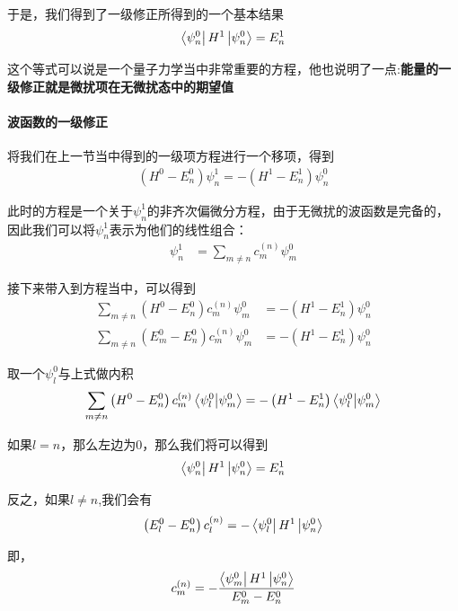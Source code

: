 \documentclass{article}
\begin{document}
于是，我们得到了一级修正所得到的一个基本结果
\begin{equation*}
    \bra{\psi_n^0}H^1\ket{\psi_n^0}=E_n^1
\end{equation*}

这个等式可以说是一个量子力学当中非常重要的方程，他也说明了一点:\textbf{能量的一级修正就是微扰项在无微扰态中的期望值}

\paragraph{波函数的一级修正}将我们在上一节当中得到的一级项方程进行一个移项，得到
\begin{align*}
    \left(H^0-E_n^0\right)\psi_n^1=-\left(H^1-E_n^1\right)\psi_n^0
\end{align*}

此时的方程是一个关于$\psi_n^1$的非齐次偏微分方程，由于无微扰的波函数是完备的，因此我们可以将$\psi_n^1$表示为他们的线性组合：
\begin{align*}
    \psi_n^1&=\sum_{m\neq n}c_m^{(n)}\psi_m^0
\end{align*}

接下来带入到方程当中，可以得到
\begin{align*}
    \sum_{m\neq n}\left(H^0-E_n^0\right)c_m^{(n)}\psi_m^0&=-\left(H^1-E_n^1\right)\psi_n^0\\
    \sum_{m\neq n}\left(E_m^0-E_n^0\right)c_m^{(n)}\psi_m^0&=-\left(H^1-E_n^1\right)\psi_n^0
\end{align*}

取一个$\psi_l^0$与上式做内积
\begin{align*}
    \sum_{m\neq n}\left(H^0-E_n^0\right)c_m^{(n)}\braket{\psi_l^0}{\psi_m^0}&=-\left(H^1-E_n^1\right)\braket{\psi_l^0}{\psi_m^0}\\
\end{align*}

如果$l=n$，那么左边为$0$，那么我们将可以得到
\begin{equation*}
    \bra{\psi_n^0}H^1\ket{\psi_n^0}=E_n^1
\end{equation*}

反之，如果$l\neq n$,我们会有
\begin{align*}
    \left(E_l^0-E_n^0\right)c_l^{(n)}=-\bra{\psi_l^0}H^1\ket{\psi_n^0}
\end{align*}

即，
\begin{align*}
    c_m^{(n)}=-\dfrac{\bra{\psi_m^0}H^1\ket{\psi_n^0}}{E_m^0-E_n^0}
\end{align*}
\end{document}
